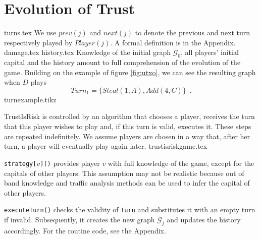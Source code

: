 \section{Evolution of Trust}
  {turns.tex}
  We use $prev\left(j\right)$ and $next\left(j\right)$ to denote the previous and next turn respectively played by
  $Player(j)$. A formal definition is in the Appendix.
  {damage.tex}
  {history.tex}
  Knowledge of the initial graph $\mathcal{G}_0$, all players' initial capital and the history amount to full comprehension of
  the evolution of the game. Building on the example of figure \ref{fig:utxo}, we can see the resulting graph when $D$ plays
  \begin{equation}
  \label{turnexample}
     Turn_1 = \{Steal\left(1, A\right), Add\left(4, C\right)\} \enspace.
  \end{equation}
  {turnexample.tikz}

  TrustIsRisk is controlled by an algorithm that chooses a player, receives the turn that
  this player wishes to play and, if this turn is valid, executes it. These steps are repeated indefinitely. We assume
  players are chosen in a way that, after her turn, a player will eventually play again later.
  {trustisriskgame.tex}

  \texttt{strategy[}$v$\texttt{]()} provides player $v$ with full knowledge of the game, except for the capitals of other
  players. This assumption may not be realistic because out of band knowledge and traffic analysis methods can be used to
  infer the capital of other players.

  \texttt{executeTurn()} checks the validity of \texttt{Turn} and substitutes it with an empty turn if invalid.
  Subsequently, it creates the new graph $\mathcal{G}_j$ and updates the history accordingly. For the routine code,
  see the Appendix.
